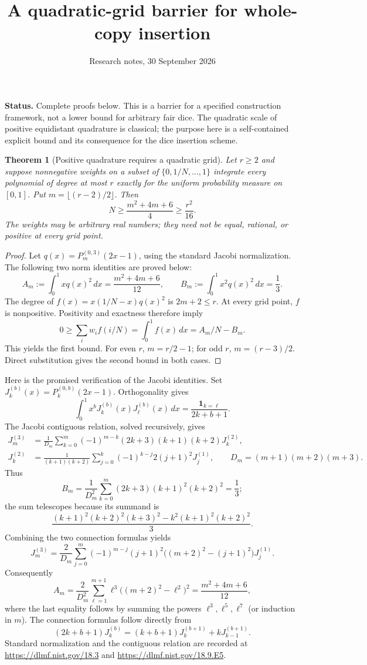 \documentclass[11pt]{article}
\title{A quadratic-grid barrier for whole-copy insertion}
\author{Research notes, 30 September 2026}
\date{}
\newtheorem{theorem}{Theorem}
\begin{document}
\maketitle
\noindent\textbf{Status.} Complete proofs below. This is a barrier for a
specified construction framework, not a lower bound for arbitrary fair dice.
The quadratic scale of positive equidistant quadrature is classical;
the purpose here is a self-contained explicit bound and its consequence
for the dice insertion scheme.

\begin{theorem}[Positive quadrature requires a quadratic grid]
Let $r\ge2$ and suppose nonnegative weights on a subset of
$\{0,1/N,\ldots,1\}$ integrate every polynomial of degree at most $r$
exactly for the uniform probability measure on $[0,1]$. Put
$m=\lfloor(r-2)/2\rfloor$. Then
\[
 N\ge\frac{m^2+4m+6}{4}\ge\frac{r^2}{16}.
\]
The weights may be arbitrary real numbers; they need not be equal,
rational, or positive at every grid point.
\end{theorem}
\begin{proof}
Let $q(x)=P_m^{(0,3)}(2x-1)$, using the standard Jacobi normalization.
The following two norm identities are proved below:
\[
 A_m:=\int_0^1xq(x)^2\,dx=\frac{m^2+4m+6}{12},
 \qquad B_m:=\int_0^1x^2q(x)^2\,dx=\frac13.
\]
The degree of $f(x)=x(1/N-x)q(x)^2$ is $2m+2\le r$.
At every grid point, $f$ is nonpositive. Positivity and exactness
therefore imply
\[
 0\ge\sum_i w_i f(i/N)=\int_0^1f(x)\,dx=A_m/N-B_m.
\]
This yields the first bound. For even $r$, $m=r/2-1$; for odd $r$,
$m=(r-3)/2$. Direct substitution gives the second bound in both cases.
\end{proof}

Here is the promised verification of the Jacobi identities. Set
$J_k^{(b)}(x)=P_k^{(0,b)}(2x-1)$. Orthogonality gives
\[
 \int_0^1x^bJ_k^{(b)}(x)J_\ell^{(b)}(x)\,dx
   =\frac{\mathbf1_{k=\ell}}{2k+b+1}.
\]
The Jacobi contiguous relation, solved recursively, gives
\begin{align*}
 J_m^{(3)}
 &=\frac1{D_m}\sum_{k=0}^m(-1)^{m-k}
     (2k+3)(k+1)(k+2)J_k^{(2)},\\
 J_k^{(2)}
 &=\frac1{(k+1)(k+2)}\sum_{j=0}^k(-1)^{k-j}
     2(j+1)^2J_j^{(1)},
 \qquad D_m=(m+1)(m+2)(m+3).
\end{align*}
Thus
\[
 B_m=\frac1{D_m^2}\sum_{k=0}^m(2k+3)(k+1)^2(k+2)^2=\frac13;
\]
the sum telescopes because its summand is
\[
 \frac{(k+1)^2(k+2)^2(k+3)^2-k^2(k+1)^2(k+2)^2}{3}.
\]
Combining the two connection formulas yields
\[
 J_m^{(3)}=\frac2{D_m}\sum_{j=0}^m(-1)^{m-j}(j+1)^2
   \bigl((m+2)^2-(j+1)^2\bigr)J_j^{(1)}.
\]
Consequently
\[
 A_m=\frac2{D_m^2}\sum_{\ell=1}^{m+1}\ell^3
       \bigl((m+2)^2-\ell^2\bigr)^2
     =\frac{m^2+4m+6}{12},
\]
where the last equality follows by summing the powers $\ell^3,\ell^5,
\ell^7$ (or induction in $m$). The connection formulas follow directly
from
\[
 (2k+b+1)J_k^{(b)}=(k+b+1)J_k^{(b+1)}+kJ_{k-1}^{(b+1)}.
\]
Standard normalization and the contiguous relation are recorded at
\url{https://dlmf.nist.gov/18.3} and
\url{https://dlmf.nist.gov/18.9.E5}.
\end{document}

